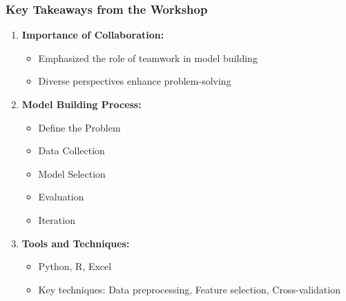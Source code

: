 \documentclass{beamer}
\begin{document}
\begin{frame}[fragile]
    \frametitle{Key Takeaways from the Workshop}
    \begin{enumerate}
        \item \textbf{Importance of Collaboration:} 
        \begin{itemize}
            \item Emphasized the role of teamwork in model building
            \item Diverse perspectives enhance problem-solving
        \end{itemize}
        
        \item \textbf{Model Building Process:} 
        \begin{itemize}
            \item Define the Problem
            \item Data Collection
            \item Model Selection
            \item Evaluation
            \item Iteration
        \end{itemize}
        
        \item \textbf{Tools and Techniques:}
        \begin{itemize}
            \item Python, R, Excel
            \item Key techniques: Data preprocessing, Feature selection, Cross-validation
        \end{itemize}
    \end{enumerate}
\end{frame}
\end{document}
